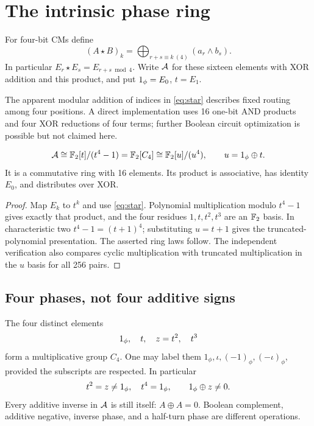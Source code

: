 \section{The intrinsic phase ring}\label{sec:ring}
\begin{definition}
For four-bit CMs define
\begin{equation}\label{eq:star}
 (A\star B)_k=\bigoplus_{r+s\equiv k\ (4)} (a_r\land b_s).
\end{equation}
In particular $E_r\star E_s=E_{r+s\bmod4}$. Write $\mathcal A$ for these sixteen elements with XOR addition and this product, and put $1_{\phi}=E_0$, $t=E_1$.
\end{definition}
The apparent modular addition of indices in \cref{eq:star} describes fixed routing among four positions. A direct implementation uses 16 one-bit AND products and four XOR reductions of four terms; further Boolean circuit optimization is possible but not claimed here.

\begin{theorem}\label{thm:ring}
\begin{equation}
 \mathcal A\cong\mathbb F_2[t]/(t^4-1)=\mathbb F_2[C_4]\cong\mathbb F_2[u]/(u^4),\qquad u=1_{\phi}\oplus t.
\end{equation}
It is a commutative ring with 16 elements. Its product is associative, has identity $E_0$, and distributes over XOR.
\end{theorem}
\begin{proof}
Map $E_k$ to $t^k$ and use \cref{eq:star}. Polynomial multiplication modulo $t^4-1$ gives exactly that product, and the four residues $1,t,t^2,t^3$ are an $\mathbb F_2$ basis. In characteristic two $t^4-1=(t+1)^4$; substituting $u=t+1$ gives the truncated-polynomial presentation. The asserted ring laws follow. The independent verification also compares cyclic multiplication with truncated multiplication in the $u$ basis for all 256 pairs.
\end{proof}

\subsection{Four phases, not four additive signs}
The four distinct elements
\begin{equation}\label{eq:phasefour}
 1_{\phi},\quad t,\quad z=t^2,\quad t^3
\end{equation}
form a multiplicative group $C_4$. One may label them $1_\phi,\iota,(-1)_\phi,(-\iota)_\phi$, provided the subscripts are respected. In particular
\begin{equation}
 t^2=z\ne1_{\phi},\quad t^4=1_{\phi},\qquad 1_{\phi}\oplus z\ne0.
\end{equation}
Every additive inverse in $\mathcal A$ is still itself: $A\oplus A=0$. Boolean complement, additive negative, inverse phase, and a half-turn phase are different operations.

